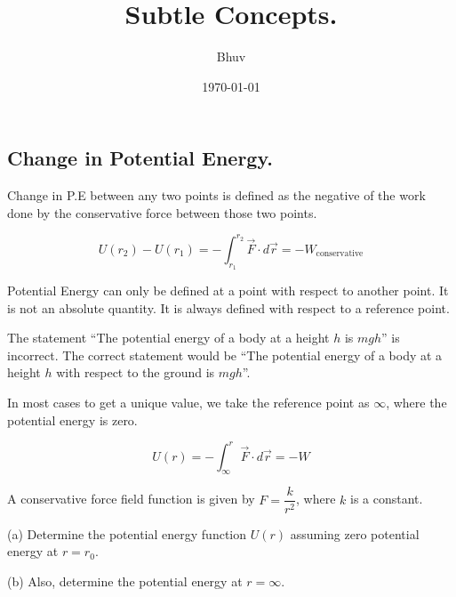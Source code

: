 \documentclass[twocolumn]{article}
\title{\textbf{Subtle Concepts.}}
\author{ Bhuv }
\date{\today}
\begin{document}
\begin{CJK*}{UTF8}{gbsn} %

\maketitle    

\section*{Change in Potential Energy.}

Change in P.E between any two points is defined as the negative of the work done by the conservative force between those two points.

\[
    U (r_2) - U (r_1) = - \int _{r_1} ^{r_2} \vec{F} \cdot d\vec{r} = - W_{\text{conservative}}
\]

Potential Energy can only be defined at a point with respect to another point. It is not an absolute quantity. It is always defined with respect to a reference point.

\vspace{0.1in}

\begin{imp}
    The statement ``The potential energy of a body at a height $h$ is $mgh$'' is incorrect. The correct statement would be ``The potential energy of a body at a height $h$ with respect to the ground is $mgh$''. 
\end{imp}

\vspace{0.1in}

In most cases to get a unique value, we take the reference point as \(\infty\), where the potential energy is zero. 

\[
    U (r) = - \int_{\infty} ^{r} \vec{F} \cdot d\vec{r} = - W
\]

\vspace{0.1in}

\begin{question}
    A conservative force field function is given by \(F = \dfrac{k}{r^{2} }\), where \(k\) is a constant.
    \vspace{0.1in}

    (a) Determine the potential energy function \(U(r)\) assuming zero potential energy at \(r = r_0\).

    \vspace{0.1in}
    (b) Also, determine the potential energy at \(r = \infty\). 
\end{question}


\end{CJK*}
\end{document}
